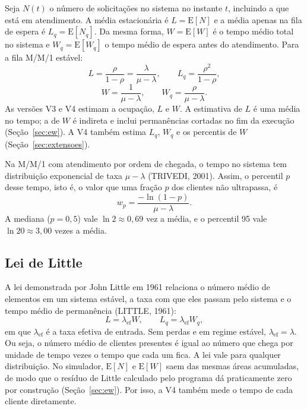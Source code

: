 \documentclass[
  article,      %
  10pt,         %
  oneside,
  a4paper,
  twocolumn,    %
  english,
  brazil        %
]{abntex2}
\newcommand{\EN}{\mathrm{E}[N]}
\newcommand{\EW}{\mathrm{E}[W]}
\newcommand{\ENq}{\mathrm{E}[N_q]}
\newcommand{\EWq}{\mathrm{E}[W_q]}
\begin{document}
Seja $N(t)$ o número de solicitações no sistema no instante $t$, incluindo a que está em atendimento. A média estacionária é $L=\EN$ e a média apenas na fila de espera é $L_q=\ENq$. Da mesma forma, $W=\EW$ é o tempo médio total no sistema e $W_q=\EWq$ o tempo médio de espera antes do atendimento. Para a fila M/M/1 estável:
\begin{equation}
  L=\frac{\rho}{1-\rho}=\frac{\lambda}{\mu-\lambda},
  \qquad L_q=\frac{\rho^2}{1-\rho},
  \label{eq:l-lq}
\end{equation}
\begin{equation}
  W=\frac{1}{\mu-\lambda},
  \qquad W_q=\frac{\rho}{\mu-\lambda}.
  \label{eq:w-wq}
\end{equation}
As versões V3 e V4 estimam a ocupação, $L$ e $W$. A estimativa de $L$ é uma média no tempo; a de $W$ é indireta e inclui permanências cortadas no fim da execução (Seção~\ref{sec:ew}). A V4 também estima $L_q$, $W_q$ e os percentis de $W$ (Seção~\ref{sec:extensoes}).

Na M/M/1 com atendimento por ordem de chegada, o tempo no sistema tem distribuição exponencial de taxa $\mu-\lambda$ (TRIVEDI, 2001). Assim, o percentil $p$ desse tempo, isto é, o valor que uma fração $p$ dos clientes não ultrapassa, é
\begin{equation}
  w_p=\frac{-\ln(1-p)}{\mu-\lambda}.
  \label{eq:percentil}
\end{equation}
A mediana ($p=0{,}5$) vale $\ln 2\approx0{,}69$ vez a média, e o percentil 95 vale $\ln 20\approx3{,}00$ vezes a média.

\subsection{Lei de Little}

A lei demonstrada por John Little em 1961 relaciona o número médio de elementos em um sistema estável, a taxa com que eles passam pelo sistema e o tempo médio de permanência (LITTLE, 1961):
\begin{equation}
  L=\lambda_{\mathrm{ef}}W,
  \qquad
  L_q=\lambda_{\mathrm{ef}}W_q,
  \label{eq:little-sistema}
\end{equation}
em que $\lambda_{\mathrm{ef}}$ é a taxa efetiva de entrada. Sem perdas e em regime estável, $\lambda_{\mathrm{ef}}=\lambda$. Ou seja, o número médio de clientes presentes é igual ao número que chega por unidade de tempo vezes o tempo que cada um fica. A lei vale para qualquer distribuição. No simulador, $\EN$ e $\EW$ saem das mesmas áreas acumuladas, de modo que o resíduo de Little calculado pelo programa dá praticamente zero por construção (Seção~\ref{sec:ew}). Por isso, a V4 também mede o tempo de cada cliente diretamente.
\end{document}
